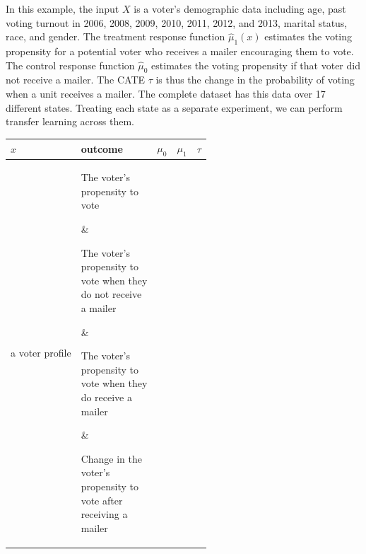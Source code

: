 In this example, the input $X$ is a voter's demographic data including age, past voting turnout in 2006, 2008, 2009, 2010, 2011, 2012, and 2013, marital status, race, and gender. The treatment response function $\hat{\mu}_1(x)$ estimates the voting propensity for a potential voter who receives a mailer encouraging them to vote. The control response function $\hat{\mu}_0$ estimates the voting propensity if that voter did not receive a mailer. 
The CATE $\tau$ is thus the change in the probability of voting when a unit receives a mailer. The complete dataset has this data over 17 different states. Treating each state as a separate experiment, we can perform transfer learning across them.  

\begin{center}
	\begin{tabular}{| p{2.3cm} | p{2.3cm} | p{2.3cm} |p{2.3cm} |p{2.3cm} |}
		\hline
		$x$ & outcome & $\mu_0$ & $\mu_1$ & $\tau$ \\ [0.5ex] 
		\hline \hline
		a voter profile & \parbox[t]{2cm}{The voter's \\ propensity to \\ vote} & \parbox[t]{2cm}{The voter's \\ propensity to \\ vote when they \\ do not receive \\ a mailer} & \parbox[t]{2cm}{The voter's \\ propensity to \\ vote when they \\ do receive a \\ mailer} & \parbox[t]{2cm}{Change in the \\ voter's \\ propensity to \\ vote after \\ receiving a \\ mailer \\ } \\  \hline
		\hline
	\end{tabular}
\end{center}

